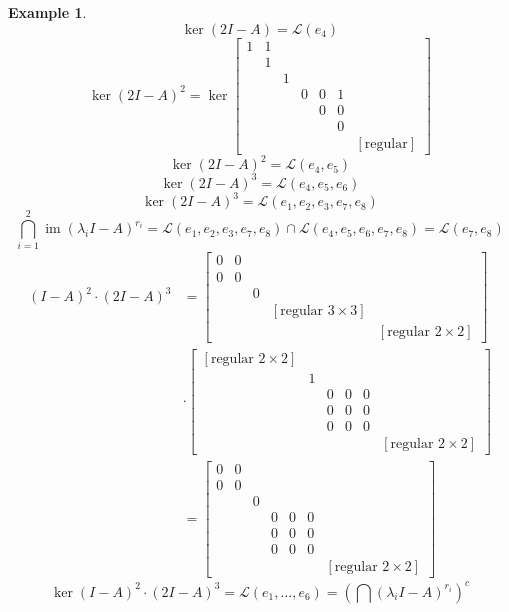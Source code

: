 \documentclass{article}
\newcounter{lecref}[section]
\numberwithin{lecref}{section}
\newtheorem{example}[lecref]{Example}
\DeclareMathOperator{\im}{im}
\begin{document}
\begin{example}
\[    \ker(2I - A) = \mathcal L(e_{4})
  \] \[
    \ker(2I - A)^2 = \ker\begin{bmatrix}
      1 & 1  &   &    &    &    &     \\   %
        & 1  &   &    &    &    &     \\   %
        &    & 1 &    &    &    &     \\
        &    &   & 0  & 0  & 1  &     \\
        &    &   &    & 0  & 0  &     \\
        &    &   &    &    & 0  &     \\
        &    &   &    &    &    & [\text{regular}]
    \end{bmatrix}
  \] \[
    \ker(2I - A)^2 = \mathcal L(e_4, e_5)
  \] \[
    \ker(2I - A)^3 = \mathcal L(e_4, e_5, e_6)
  \] \[
    \ker(2I - A)^3 = \mathcal L(e_1, e_2, e_3, e_7, e_8)
  \] \[
    \bigcap_{i=1}^2 \im(\lambda_i I - A)^{r_i} = \mathcal L(e_1, e_2, e_3, e_7, e_8) \cap \mathcal L(e_4, e_5, e_6, e_7, e_8) = \mathcal L(e_7, e_8)
  \]
  \begin{align*}
    (I - A)^2 \cdot (2I - A)^3 &= \begin{bmatrix}
      0 & 0 &   & & \\
      0 & 0 &   & & \\
        &   & 0 & & \\
        &   &   & [\text{regular } 3 \times 3] & \\
        &   &   &       & [\text{regular } 2 \times 2]
    \end{bmatrix} \\ &\cdot \begin{bmatrix}
      [\text{regular } 2 \times 2] & & & & & \\
        & 1 &   &   &   & \\
        &   & 0 & 0 & 0 & \\
        &   & 0 & 0 & 0 & \\
        &   & 0 & 0 & 0 & \\
        &   &   &   &   & [\text{regular } 2 \times 2]
    \end{bmatrix} \\ &= \begin{bmatrix}
      0 & 0 &   &   &   &   & \\
      0 & 0 &   &   &   &   & \\
        &   & 0 &   &   &   & \\
        &   &   & 0 & 0 & 0 & \\
        &   &   & 0 & 0 & 0 & \\
        &   &   & 0 & 0 & 0 & \\
        &   &   &   &   &   & [\text{regular } 2\times 2]
    \end{bmatrix}
  \end{align*} \[
    \ker{(I - A)^2 \cdot (2I - A)^3} = \mathcal L(e_1, \dots, e_6) = \left(\bigcap (\lambda_i I - A)^{r_i}\right)^c
  \]
\end{example}
\end{document}
